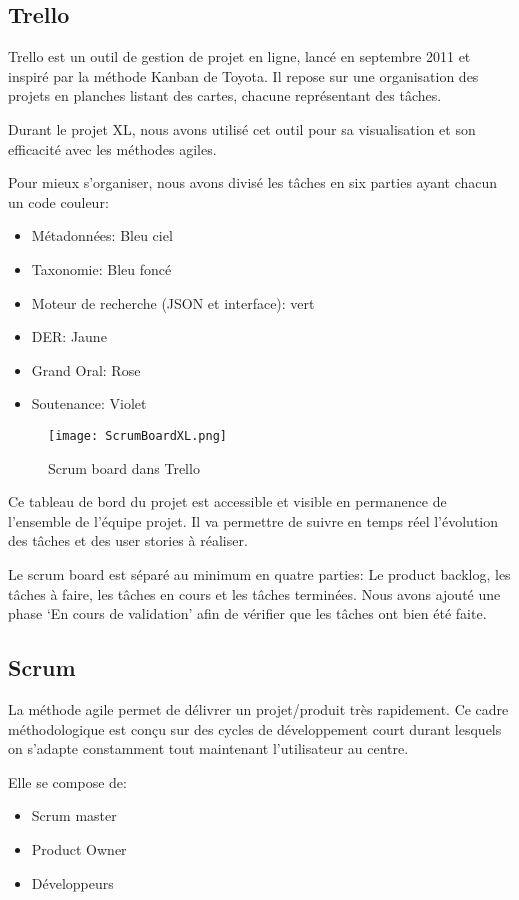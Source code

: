 \subsection{Trello}
Trello est un outil de gestion de projet en ligne, lancé en septembre 2011 et inspiré par la méthode Kanban de Toyota.
Il repose sur une organisation des projets en planches listant des cartes, chacune représentant des tâches. 

Durant le projet XL, nous avons utilisé cet outil pour sa visualisation et son efficacité avec les méthodes agiles. 

Pour mieux s’organiser, nous avons divisé les tâches en six parties ayant chacun un code couleur: 

\begin{itemize}
    \item Métadonnées: Bleu ciel 
    \item Taxonomie: Bleu foncé 
    \item Moteur de recherche (JSON et interface): vert
    \item DER\@: Jaune
    \item Grand Oral: Rose
    \item Soutenance: Violet 
\end{itemize}


\begin{figure}[h!]
  \centering
  \texttt{[image: ScrumBoardXL.png]}
	\caption[]{Scrum board dans Trello}
	\label{}
\end{figure}

Ce tableau de bord du projet est accessible et visible en permanence de l'ensemble de l'équipe projet.
Il va permettre de suivre en temps réel l'évolution des tâches et des user stories à réaliser.

Le scrum board est séparé au minimum en quatre parties: Le product backlog, les tâches à faire, les tâches en cours et les tâches terminées.
Nous avons ajouté une phase `En cours de validation' afin de vérifier que les tâches ont bien été faite. 


\subsection{Scrum}
La méthode agile permet de délivrer un projet/produit très rapidement.
Ce cadre méthodologique est conçu sur des cycles de développement court durant lesquels on s'adapte constamment tout maintenant l'utilisateur au centre. 

Elle se compose de:
\begin{itemize}
    \item Scrum master 
    \item Product Owner 
    \item Développeurs 
\end{itemize}

